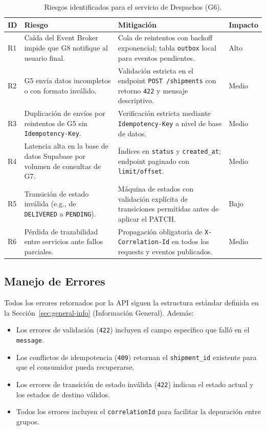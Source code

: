 \documentclass[11pt, a4paper]{article}
\begin{document}
\begin{table}[!ht]
\centering
\renewcommand{\arraystretch}{1.4}
\begin{tabularx}{\textwidth}{l X X l}
  \toprule
  \textbf{ID} & \textbf{Riesgo} & \textbf{Mitigación} & \textbf{Impacto} \\
  \midrule
  R1 & Caída del Event Broker impide que G8 notifique al usuario final. & Cola de reintentos con backoff exponencial; tabla \texttt{outbox} local para eventos pendientes. & Alto \\
  R2 & G5 envía datos incompletos o con formato inválido. & Validación estricta en el endpoint \texttt{POST /shipments} con retorno \texttt{422} y mensaje descriptivo. & Medio \\
  R3 & Duplicación de envíos por reintentos de G5 sin \texttt{Idempotency-Key}. & Verificación estricta mediante \texttt{Idempotency-Key} a nivel de base de datos. & Medio \\
  R4 & Latencia alta en la base de datos Supabase por volumen de consultas de G7. & Índices en \texttt{status} y \texttt{created\_at}; endpoint paginado con \texttt{limit/offset}. & Medio \\
  R5 & Transición de estado inválida (e.g., de \texttt{DELIVERED} a \texttt{PENDING}). & Máquina de estados con validación explícita de transiciones permitidas antes de aplicar el PATCH. & Bajo \\
  R6 & Pérdida de trazabilidad entre servicios ante fallos parciales. & Propagación obligatoria de \texttt{X-Correlation-Id} en todos los requests y eventos publicados. & Medio \\
  \bottomrule
\end{tabularx}
\caption{Riesgos identificados para el servicio de Despachos (G6).}
\end{table}

\subsection{Manejo de Errores}

Todos los errores retornados por la API siguen la estructura estándar definida en la Sección~\ref{sec:general-info} (Información General). Además:

\begin{itemize}[noitemsep]
  \item Los errores de validación (\texttt{422}) incluyen el campo específico que falló en el \texttt{message}.
  \item Los conflictos de idempotencia (\texttt{409}) retornan el \texttt{shipment\_id} existente para que el consumidor pueda recuperarse.
  \item Los errores de transición de estado inválida (\texttt{422}) indican el estado actual y los estados de destino válidos.
  \item Todos los errores incluyen el \texttt{correlationId} para facilitar la depuración entre grupos.
\end{itemize}
\end{document}
